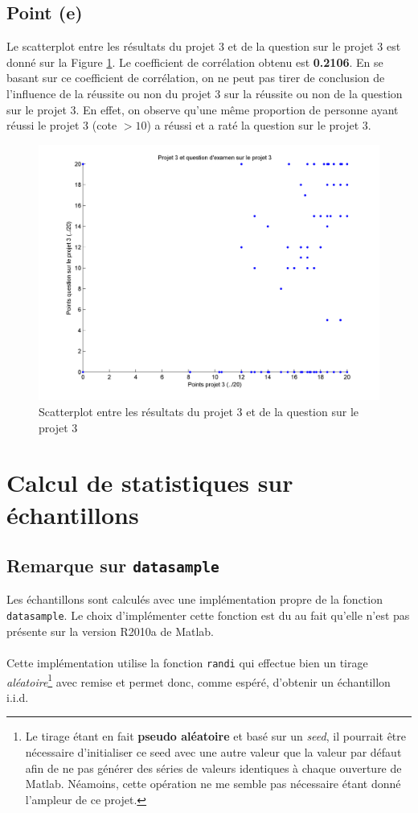 \documentclass[a4paper,11pt]{article}
\begin{document}
\subsection{Point (e)}
Le scatterplot entre les résultats du projet 3 et de la question sur le projet 3 est donné sur la Figure \ref{fig:q1e_scatt}. Le coefficient de corrélation  obtenu est \textbf{0.2106}. En se basant sur ce coefficient de corrélation, on ne peut pas tirer de conclusion de l'influence de la réussite ou non du projet 3 sur la réussite ou non de la question sur le projet 3. En effet, on observe qu'une même proportion de personne ayant réussi le projet 3 (cote $> 10$) a réussi et a raté la question sur le projet 3.
\begin{figure}[!h]
	\center
	\includegraphics[scale=0.5]{q1d-scatterplot.png}
	\caption{Scatterplot entre les résultats du projet 3 et de la question sur le projet 3}
	\label{fig:q1e_scatt}
\end{figure}

\section{Calcul de statistiques sur échantillons}
\subsection{Remarque sur \texttt{datasample}}
Les échantillons sont calculés avec une implémentation propre de la fonction \texttt{datasample}. Le choix d'implémenter cette fonction est du au fait qu'elle n'est pas présente sur la version R2010a de Matlab.
\paragraph{}
Cette implémentation utilise la fonction \texttt{randi} qui effectue bien un tirage \textit{aléatoire}\footnote{Le tirage étant en fait \textbf{pseudo aléatoire} et basé sur un \textit{seed}, il pourrait être nécessaire d'initialiser ce seed avec une autre valeur que la valeur par défaut afin de ne pas générer des séries de valeurs identiques à chaque ouverture de Matlab. Néamoins, cette opération ne me semble pas nécessaire étant donné l'ampleur de ce projet.} avec remise et permet donc, comme espéré, d'obtenir un échantillon i.i.d. 
\end{document}
